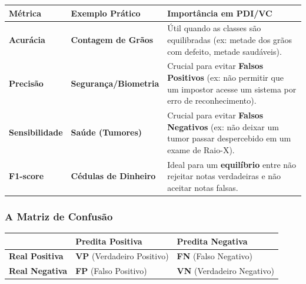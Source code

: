 \documentclass[
  portuguese,
  letterpaper,
  openany,
  oneside,
  12pt,
  a4paper]{book}
\begin{document}
\begin{longtable}[]{@{}
  >{\raggedright\arraybackslash}p{}
  >{\raggedright\arraybackslash}p{}
  >{\raggedright\arraybackslash}p{}@{}}
\toprule\noalign{}
\begin{minipage}[b]{\linewidth}\raggedright
Métrica
\end{minipage} & \begin{minipage}[b]{\linewidth}\raggedright
Exemplo Prático
\end{minipage} & \begin{minipage}[b]{\linewidth}\raggedright
Importância em PDI/VC
\end{minipage} \\
\midrule\noalign{}
\endhead
\bottomrule\noalign{}
\endlastfoot
\textbf{Acurácia} & \textbf{Contagem de Grãos} & Útil quando as classes
são equilibradas (ex: metade dos grãos com defeito, metade
saudáveis). \\
\textbf{Precisão} & \textbf{Segurança/Biometria} & Crucial para evitar
\textbf{Falsos Positivos} (ex: não permitir que um impostor acesse um
sistema por erro de reconhecimento). \\
\textbf{Sensibilidade} & \textbf{Saúde (Tumores)} & Crucial para evitar
\textbf{Falsos Negativos} (ex: não deixar um tumor passar despercebido
em um exame de Raio-X). \\
\textbf{F1-score} & \textbf{Cédulas de Dinheiro} & Ideal para um
\textbf{equilíbrio} entre não rejeitar notas verdadeiras e não aceitar
notas falsas. \\
\end{longtable}

\subsubsection{\texorpdfstring{ A Matriz de
Confusão}{ A Matriz de Confusão}}\label{a-matriz-de-confusuxe3o}

\begin{longtable}[]{@{}
  >{\raggedright\arraybackslash}p{}
  >{\raggedright\arraybackslash}p{}
  >{\raggedright\arraybackslash}p{}@{}}
\toprule\noalign{}
\begin{minipage}[b]{\linewidth}\raggedright
\end{minipage} & \begin{minipage}[b]{\linewidth}\raggedright
\textbf{Predita Positiva}
\end{minipage} & \begin{minipage}[b]{\linewidth}\raggedright
\textbf{Predita Negativa}
\end{minipage} \\
\midrule\noalign{}
\endhead
\bottomrule\noalign{}
\endlastfoot
\textbf{Real Positiva} & \textbf{VP} (Verdadeiro Positivo) & \textbf{FN}
(Falso Negativo) \\
\textbf{Real Negativa} & \textbf{FP} (Falso Positivo) & \textbf{VN}
(Verdadeiro Negativo) \\
\end{longtable}
\end{document}
